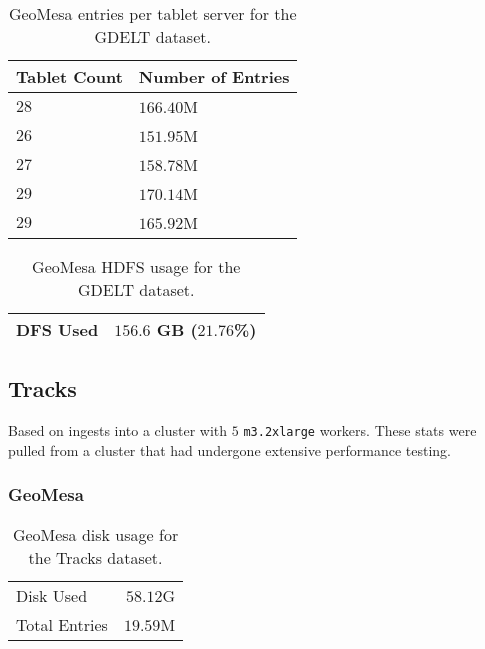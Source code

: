 \begin{table}[htb]
  \centering
  \begin{tabular}{ | l| | l | }
    \hline
    Tablet Count & Number of Entries \\ \hline
    $28$ & $166.40$M \\
    $26$ & $151.95$M \\
    $27$ & $158.78$M \\
    $29$ & $170.14$M \\
    $29$ & $165.92$M \\
    \hline
  \end{tabular}
  \caption{GeoMesa entries per tablet server for the GDELT dataset.}
  \label{table:gdelt:geowave:tablets}
\end{table}

\begin{table}[htb]
  \centering
  \begin{tabular}{ | l | l | }
    \hline
    DFS Used & $156.6$ GB ($21.76$\%) \\
    \hline
  \end{tabular}
  \caption{GeoMesa HDFS usage for the GDELT dataset.}
  \label{table:gdelt:geowave:hdfs}
\end{table}

\subsection{Tracks}

Based on ingests into a cluster with $5$ \texttt{m3.2xlarge} workers.
These stats were pulled from a cluster that had undergone extensive performance testing.

\subsubsection{GeoMesa}

\begin{table}[htb]
  \centering
  \begin{tabular}{ | l | r | }
    \hline
    Disk Used & $58.12$G \\
    Total Entries & $19.59$M \\
    \hline
  \end{tabular}
  \caption{GeoMesa disk usage for the Tracks dataset.}
  \label{table:tracks:geomesa:disk}
\end{table}

